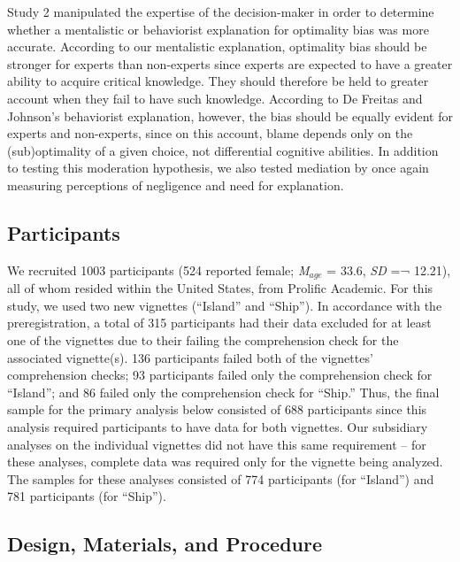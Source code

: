\documentclass[
  man,floatsintext]{apa6}
\begin{document}
Study 2 manipulated the expertise of the decision-maker in order to determine whether a mentalistic or behaviorist explanation for optimality bias was more accurate. According to our mentalistic explanation, optimality bias should be stronger for experts than non-experts since experts are expected to have a greater ability to acquire critical knowledge. They should therefore be held to greater account when they fail to have such knowledge. According to De Freitas and Johnson's behaviorist explanation, however, the bias should be equally evident for experts and non-experts, since on this account, blame depends only on the (sub)optimality of a given choice, not differential cognitive abilities. In addition to testing this moderation hypothesis, we also tested mediation by once again measuring perceptions of negligence and need for explanation.

\hypertarget{participants}{%
\subsection{Participants}\label{participants}}

We recruited 1003 participants (524 reported female; \emph{M}\(_{age}\) = 33.6, \emph{SD} =¬ 12.21), all of whom resided within the United States, from Prolific Academic. For this study, we used two new vignettes (``Island'' and ``Ship''). In accordance with the preregistration, a total of 315 participants had their data excluded for at least one of the vignettes due to their failing the comprehension check for the associated vignette(s). 136 participants failed both of the vignettes' comprehension checks; 93 participants failed only the comprehension check for ``Island''; and 86 failed only the comprehension check for ``Ship.'' Thus, the final sample for the primary analysis below consisted of 688 participants since this analysis required participants to have data for both vignettes. Our subsidiary analyses on the individual vignettes did not have this same requirement -- for these analyses, complete data was required only for the vignette being analyzed. The samples for these analyses consisted of 774 participants (for ``Island'') and 781 participants (for ``Ship'').

\hypertarget{design-materials-and-procedure}{%
\subsection{Design, Materials, and Procedure}\label{design-materials-and-procedure}}
\end{document}
